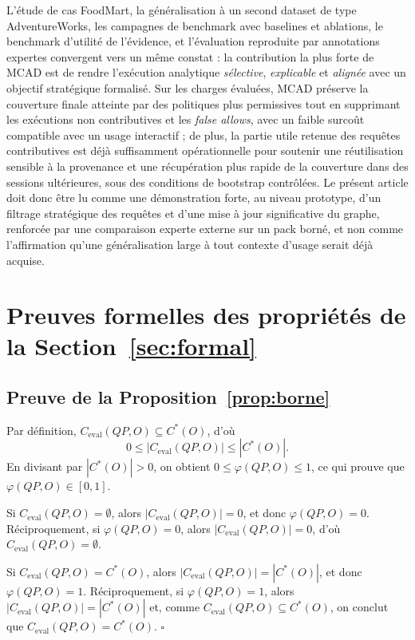 \documentclass[journal]{IEEEtran}
\begin{document}
L'étude de cas FoodMart, la généralisation à un second dataset de type AdventureWorks, les campagnes de benchmark avec baselines et ablations, le benchmark d'utilité de l'évidence, et l'évaluation reproduite par annotations expertes convergent vers un même constat : la contribution la plus forte de MCAD est de rendre l'exécution analytique \emph{sélective}, \emph{explicable} et \emph{alignée} avec un objectif stratégique formalisé. Sur les charges évaluées, MCAD préserve la couverture finale atteinte par des politiques plus permissives tout en supprimant les exécutions non contributives et les \emph{false allows}, avec un faible surcoût compatible avec un usage interactif ; de plus, la partie utile retenue des requêtes contributives est déjà suffisamment opérationnelle pour soutenir une réutilisation sensible à la provenance et une récupération plus rapide de la couverture dans des sessions ultérieures, sous des conditions de bootstrap contrôlées. Le présent article doit donc être lu comme une démonstration forte, au niveau prototype, d'un filtrage stratégique des requêtes et d'une mise à jour significative du graphe, renforcée par une comparaison experte externe sur un pack borné, et non comme l'affirmation qu'une généralisation large à tout contexte d'usage serait déjà acquise.

\appendices

\section{Preuves formelles des propriétés de la Section~\ref{sec:formal}}
\label{app:proofs}

\subsection*{Preuve de la Proposition~\ref{prop:borne}}

Par définition, $C_{\mathrm{eval}}(QP,O)\subseteq C^*(O)$, d'où
\[
0\le |C_{\mathrm{eval}}(QP,O)|\le |C^*(O)|.
\]
En divisant par $|C^*(O)|>0$, on obtient $0\le \varphi(QP,O)\le 1$, ce qui prouve que $\varphi(QP,O)\in[0,1]$.

Si $C_{\mathrm{eval}}(QP,O)=\emptyset$, alors $|C_{\mathrm{eval}}(QP,O)|=0$, et donc $\varphi(QP,O)=0$. Réciproquement, si $\varphi(QP,O)=0$, alors $|C_{\mathrm{eval}}(QP,O)|=0$, d'où $C_{\mathrm{eval}}(QP,O)=\emptyset$.

Si $C_{\mathrm{eval}}(QP,O)=C^*(O)$, alors $|C_{\mathrm{eval}}(QP,O)|=|C^*(O)|$, et donc $\varphi(QP,O)=1$. Réciproquement, si $\varphi(QP,O)=1$, alors $|C_{\mathrm{eval}}(QP,O)|=|C^*(O)|$ et, comme $C_{\mathrm{eval}}(QP,O)\subseteq C^*(O)$, on conclut que $C_{\mathrm{eval}}(QP,O)=C^*(O)$. \hfill$\square$
\end{document}
